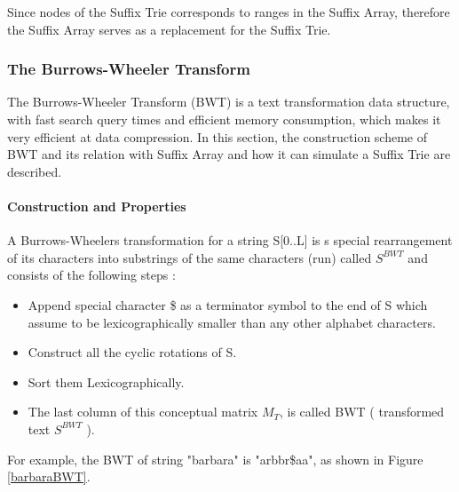 \documentclass[11pt,a4paper]{report}
\begin{document}
Since nodes of the Suffix Trie corresponds to ranges in the Suffix 
Array, therefore the Suffix Array serves as a replacement for 
the Suffix Trie.



\subsubsection{The Burrows-Wheeler Transform} 
\label{The Burrows-Wheeler Transform}


The Burrows-Wheeler Transform (BWT) is a text transformation data structure, 
with fast search query times and efficient memory consumption, which makes 
it very efficient at data compression. In this section, the construction scheme
of BWT and its relation with Suffix Array and how it can simulate a Suffix Trie 
are described.\\



\paragraph{Construction and Properties}

A Burrows-Wheelers transformation for a string S[0..L] is s special rearrangement 
of its characters into substrings of the same characters (run) called $S^{BWT}$ 
and consists of the following steps \cite{bwt}:

\begin{itemize} 
	\item Append special character \$ as a terminator symbol to the end of S 
	which assume to be lexicographically smaller than any other alphabet 
	characters.
	\item  Construct all the cyclic rotations of S.
	\item  Sort them Lexicographically.
	\item The last column of this conceptual matrix \emph{$M_{T}$}, is called 
	BWT ( transformed text $S^{BWT}$ ).
\end{itemize}


For example, the BWT of string "barbara" is "arbbr\$aa", as shown in Figure 
\ref{barbaraBWT}.\\
\end{document}
